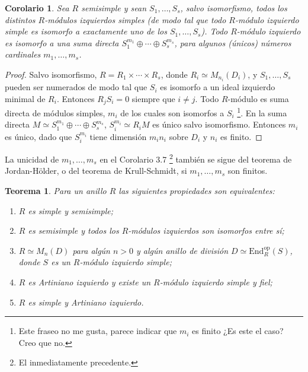 \documentclass{article}
\newtheorem{theorem}{Teorema}[section]
\newtheorem{corollary}{Corolario}[section]
\newcommand{\End}{\text{End}}
\begin{document}
\begin{corollary}
    Sea $R$ semisimple y sean $S_1, \dots, S_s$, salvo isomorfismo, todos los distintos $R$-módulos izquierdos simples (de modo tal que todo $R$-módulo izquierdo simple es isomorfo a exactamente uno de los $S_1, \dots, S_s$).
    Todo $R$-módulo izquierdo es isomorfo a una suma directa $S_1^{m_1} \oplus \cdots \oplus S_s^{m_s}$, para algunos (únicos) números cardinales $m_1, \dots, m_s$.
\end{corollary}

\begin{proof}
    Salvo isomorfismo, $R = R_1 \times \cdots \times R_s$, donde $R_i \simeq M_{n_i}(D_i)$, y $S_1, \dots, S_s$ pueden ser numerados de modo tal que $S_i$ es isomorfo a un ideal izquierdo minimal de $R_i$.
    Entonces $R_j S_i = 0$ siempre que $i \neq j$.
    Todo $R$-módulo es suma directa de módulos simples, $m_i$ de los cuales son isomorfos a $S_i$
    \footnote{
        Este fraseo no me gusta, parece indicar que $m_i$ es finito ¿Es este el caso? Creo que no.
    }.
    En la suma directa $M \simeq S_1^{m_1} \oplus \cdots \oplus S_s^{m_s}$, $S_i^{m_i} \simeq R_i M$ es único salvo isomorfismo.
    Entonces $m_i$ es único, dado que $S_i^{m_i}$ tiene dimensión $m_i n_i$ sobre $D_i$ y $n_i$ es finito.
\end{proof}

La unicidad de $m_1, \dots, m_s$ en el Corolario 3.7
\footnote{El inmediatamente precedente.}
también se sigue del teorema de Jordan-Hölder, o del teorema de Krull-Schmidt, si $m_1, \dots, m_s$ son finitos.

\begin{theorem}\label{thm:equivalent-properties-simple-rings}
    Para un anillo $R$ las siguientes propiedades son equivalentes:
    \begin{enumerate}
        \item $R$ es simple y semisimple; \label{item:simple-semisimple}
        \item $R$ es semisimple y todos los $R$-módulos izquierdos son isomorfos entre sí; \label{item:semisimple-isomorfos}
        \item $R \simeq M_n(D)$ para algún $n > 0$ y algún anillo de división $D \simeq \End^{\text{op}}_R(S)$, donde $S$ es un $R$-módulo izquierdo simple; \label{item:matrix-division}
        \item $R$ es Artiniano izquierdo y existe un $R$-módulo izquierdo simple y fiel; \label{item:artiniano-fiel}
        \item $R$ es simple y Artiniano izquierdo. \label{item:simple-artiniano}
    \end{enumerate}
\end{theorem}
\end{document}
